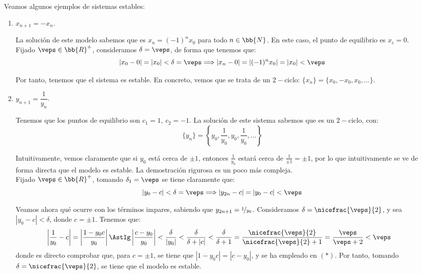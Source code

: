 \begin{ejemplo} \label{ejemplo:estabilidad}
    Veamos algunos ejemplos de sistemas estables:
    \begin{enumerate}
        \item $x_{n+1} = -x_n$.

        La solución de este modelo sabemos que es $x_n=(-1)^nx_0$ para todo $n\in \bb{N}$.
        En este caso, el punto de equilibrio es $x_c=0$. Fijado $\veps\in \bb{R}^+$, consideramos $\delta=\veps$, de forma que tenemos que:
        \begin{equation*}
            |x_0-0| = |x_0|<\delta=\veps \Longrightarrow
            |x_n-0| = |(-1)^nx_0| = |x_0|<\veps
        \end{equation*}

        Por tanto, tenemos que el sistema es estable. En concreto, vemos que se trata de un $2-$ciclo: $\{x_n\}=\{x_0, -x_0, x_0,\dots\}$.
        
        \item $y_{n+1} = \dfrac{1}{y_n}$.

        Tenemos que los puntos de equilibrio son ${c_1}=1,~{c_2}=-1$. La solución de este sistema sabemos que es un $2-$ciclo, con:
        \begin{equation*}
            \{y_n\} = \left\{y_0, \frac{1}{y_0}, y_0, \frac{1}{y_0}, \dots\right\}
        \end{equation*}

        Intuitivamente, vemos claramente que si $y_0$ está cerca de $\pm 1$, entonces $\frac{1}{y_0}$ estará cerca de $\frac{1}{\pm 1}=\pm 1$, por lo que intuitivamente se ve de forma directa que el modelo es estable. La demostración rigurosa es un poco más compleja.\\

        
        Fijado $\veps\in \bb{R}^+$, tomando $\delta_1=\veps$ se tiene claramente que:
        \begin{equation*}
            |y_0-c| <\delta=\veps \Longrightarrow
            |y_{2n}-c| = |y_0-c| <\veps
        \end{equation*}

        Veamos ahora qué ocurre con los términos impares, sabiendo que $y_{2n+1}=\nicefrac{1}{y_0}$. Consideramos $\delta=\nicefrac{\veps}{2}$, y sea $|y_0-c|<\delta$, donde $c=\pm 1$. Tenemos que:
        \begin{align*}
            \left|\frac{1}{y_0}-c\right|
            &= \left|\frac{1-y_0c}{y_0}\right|
            \AstIg \left|\frac{c-y_0}{y_0}\right| < \frac{\delta}{|y_0|}
            < \frac{\delta}{\delta + |c|}
            < \frac{\delta}{\delta + 1} = \frac{\nicefrac{\veps}{2}}{\nicefrac{\veps}{2}+1}
            = \frac{\veps}{\veps+2} < \veps
        \end{align*}
        donde es directo comprobar que, para $c=\pm 1$, se tiene que $|1-y_0c| = |c-y_0|$, y se ha empleado en $(\ast)$. Por tanto, tomando $\delta = \nicefrac{\veps}{2}$, se tiene que el modelo es estable.    
    \end{enumerate}
\end{ejemplo}

